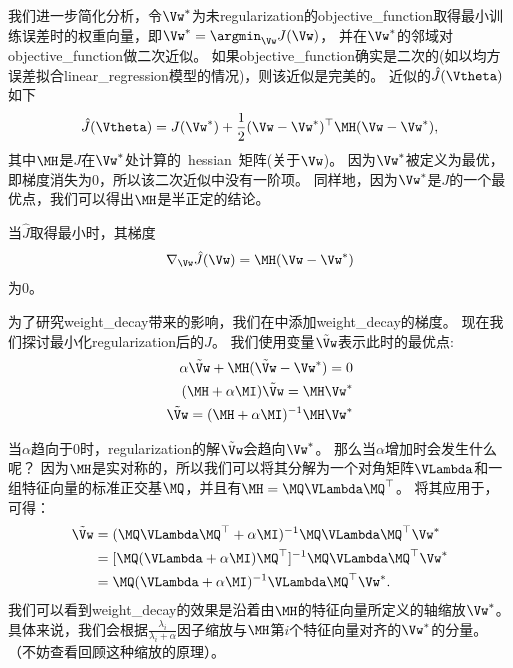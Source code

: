 我们进一步简化分析，令$\Vw^*$为未\gls{regularization}的\gls{objective_function}取得最小训练误差时的权重向量，即$\Vw^* = \argmin_{\Vw} J(\Vw)$， 并在$\Vw^*$的邻域对\gls{objective_function}做二次近似。  
如果\gls{objective_function}确实是二次的(如以均方误差拟合\gls{linear_regression}模型的情况)，则该近似是完美的。
近似的$\hat J(\Vtheta)$如下
\begin{align}
 \hat J(\Vtheta) = J(\Vw^*) + \frac{1}{2}(\Vw - \Vw^*)^\top \MH (\Vw - \Vw^*),
\end{align}
其中$\MH$是$J$在$\Vw^*$处计算的~\gls{hessian}~矩阵(关于$\Vw$)。
因为$\Vw^*$被定义为最优，即梯度消失为$0$，所以该二次近似中没有一阶项。
同样地，因为$\Vw^*$是$J$的一个最优点，我们可以得出$\MH$是半正定的结论。

当$\hat J$取得最小时，其梯度
\begin{align}
\label{eq:gradient}
  \nabla_{\Vw} \hat{J}(\Vw) = \MH (\Vw - \Vw^*)
\end{align}
为$0$。

为了研究\gls{weight_decay}带来的影响，我们在中添加\gls{weight_decay}的梯度。 
现在我们探讨最小化\gls{regularization}后的$\hat J$。
我们使用变量$\tilde{\Vw}$表示此时的最优点:
\begin{align}
 \alpha \tilde{\Vw} + \MH (\tilde{\Vw} - \Vw^*) = 0 \\
 (\MH + \alpha \MI) \tilde{\Vw} = \MH \Vw^* \\
 \tilde{\Vw} = (\MH + \alpha \MI)^{-1} \MH \Vw^* \label{eq:final_w}
 \end{align}

当$\alpha$趋向于$0$时，\gls{regularization}的解$\tilde{\Vw}$会趋向$\Vw^*$。 
那么当$\alpha$增加时会发生什么呢？
因为$\MH$是实对称的，所以我们可以将其分解为一个对角矩阵$\VLambda$和一组特征向量的标准正交基$\MQ$，并且有$\MH = \MQ \VLambda \MQ^\top$。
将其应用于，可得：
\begin{align}
 \tilde \Vw &= ( \MQ \VLambda \MQ^\top + \alpha \MI)^{-1} \MQ \VLambda \MQ^\top \Vw^* \\
                 &=  [ \MQ( \VLambda+ \alpha \MI)  \MQ^\top ]^{-1} \MQ \VLambda \MQ^\top \Vw^* \\
                 &= \MQ( \VLambda+ \alpha \MI)^{-1} \VLambda \MQ^\top \Vw^*. \label{eq:713L2}
\end{align}
我们可以看到\gls{weight_decay}的效果是沿着由$\MH$的特征向量所定义的轴缩放$\Vw^*$。
具体来说，我们会根据$\frac{\lambda_i}{\lambda_i + \alpha}$因子缩放与$\MH$第$i$个特征向量对齐的$\Vw^*$的分量。
（不妨查看回顾这种缩放的原理）。


